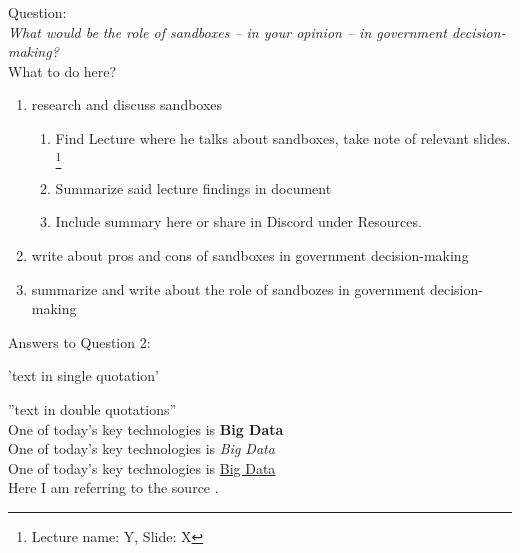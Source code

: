 Question:\\
\emph{
    What would be the role of sandboxes – in your opinion – in government decision-making?
}\\

What to do here?
\begin{enumerate}
    \item research and discuss sandboxes
    \begin{enumerate}
    \item Find Lecture where he talks about sandboxes, take note of relevant slides.
    \footnote{Lecture name: Y, Slide: X}
    \item Summarize said lecture findings in document
    \item Include summary here or share in Discord under Resources.
    \end{enumerate}
    \item write about pros and cons of sandboxes in government decision-making
    \item summarize and write about the role of sandbozes in government decision-making
  \end{enumerate}

Answers to Question 2:

'text in single quotation'

''text in double quotations''\\

One of today’s key technologies is \textbf{Big Data}\\
One of today’s key technologies is \textit{Big Data}\\
One of today’s key technologies is \underline{Big Data}\\

Here I am referring to the source \cite{BigData}.